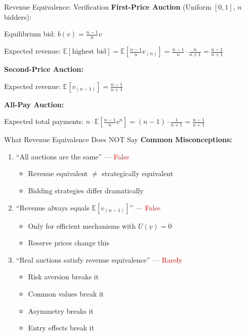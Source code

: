 \documentclass[xcolor={x11names}, aspectratio=169 ]{beamer}
\newcommand{\E}{\mathbb{E}}
\begin{document}
\begin{frame}{Revenue Equivalence: Verification}
\textbf{First-Price Auction} (Uniform $[0,1]$, $n$ bidders):

Equilibrium bid: $b(v) = \frac{n-1}{n}v$

Expected revenue: $\E[\text{highest bid}] = \E\left[\frac{n-1}{n}v_{(n)}\right] = \frac{n-1}{n} \cdot \frac{n}{n+1} = \frac{n-1}{n+1}$

\textbf{Second-Price Auction:}

Expected revenue: $\E[v_{(n-1)}] = \frac{n-1}{n+1}$ \checkmark

\textbf{All-Pay Auction:}

Expected total payments: $n \cdot \E\left[\frac{n-1}{n}v^n\right] = (n-1) \cdot \frac{1}{n+1} = \frac{n-1}{n+1}$ \checkmark
\end{frame}



\begin{frame}{What Revenue Equivalence Does NOT Say}
\textbf{Common Misconceptions:}

\begin{enumerate}
  \item ``All auctions are the same'' --- \textcolor{red}{False}
  \begin{itemize}
    \item Revenue equivalent $\neq$ strategically equivalent
    \item Bidding strategies differ dramatically
  \end{itemize}
  
  \item ``Revenue always equals $\E[v_{(n-1)}]$'' --- \textcolor{red}{False}
  \begin{itemize}
    \item Only for efficient mechanisms with $U(\underline{v}) = 0$
    \item Reserve prices change this
  \end{itemize}
  
  \item ``Real auctions satisfy revenue equivalence'' --- \textcolor{red}{Rarely}
  \begin{itemize}
    \item Risk aversion breaks it
    \item Common values break it
    \item Asymmetry breaks it
    \item Entry effects break it
  \end{itemize}
\end{enumerate}
\end{frame}
\end{document}
